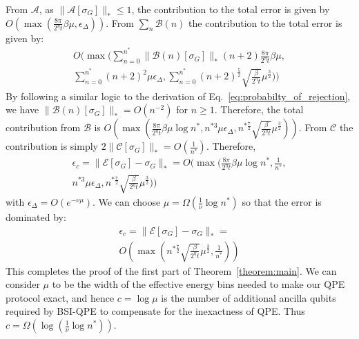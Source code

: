 \documentclass[aps,floatfix,10pt,amssymb,amsfont,amsmath,superscriptaddress,float,nofootinbib,longbibliography,nobalancelastpage,twocolumn]{revtex4-2}
\begin{document}
From $\mathcal{A}$, as $\|\mathcal{A}[\sigma_G]\|_* \leq 1$, the contribution to the total error is given by $O(\max(\frac{8\pi}{2^{\eta}t}\beta\mu,\epsilon_{\Delta}))$. From $\sum_n\mathcal{B}(n)$ the contribution to the total error is given by:
\begin{multline}
    O\!\bigg(\max\!\bigg(\sum_{n=0}^{n^*}\|\mathcal B(n)[\sigma_G]\|_* (n+2)\frac{8\pi}{2^{\eta}t}\beta \mu,\\
    \sum_{n=0}^{n^*}(n+2)^2\mu\epsilon_{\Delta}, \sum_{n=0}^{n^*}(n+2)^{\frac{5}{2}}\sqrt{\frac{\beta }{2^{\eta}t}}\mu^{\frac{3}{2}}\bigg)\bigg)
\end{multline}
By following a similar logic to the derivation of Eq.~\eqref{eq:probabilty_of_rejection}, we have $\|\mathcal B(n)[\sigma_G]\|_* = O(n^{-2})$ for $n\geq1$. Therefore, the total contribution from $\mathcal{B}$ is $O(\!\max(\frac{8\pi}{2^{\eta}t}\beta \mu \log n^*,n^{*3}\mu\epsilon_{\Delta},n^{*\frac{7}{2}}\sqrt{\frac{\beta }{2^{\eta}t}}\mu^{\frac{3}{2}}))$. From $\mathcal{C}$ the contribution is simply $2\|\mathcal{C}[\sigma_G]\|_* = O(\frac{1}{n^*})$. Therefore,
 \begin{multline}
   \epsilon_c = \|\mathcal{E}[\sigma_G] - \sigma_G\|_* = O\bigg(\max\bigg( \frac{8\pi}{2^{\eta}t}\beta\mu \log n^* ,\frac{1}{n^*},\\ n^{*3}\mu\epsilon_{\Delta},n^{*\frac{7}{2}}\sqrt{\frac{\beta }{2^{\eta}t}}\mu^{\frac{3}{2}}\bigg)\bigg)
   \label{eq:combinedtotalerror}
\end{multline}
with $\epsilon_{\Delta}=O(e^{-\nu\mu})$. We can choose $\mu = \Omega(\frac{1}{\nu}\log n^*)$ so that the error is dominated by:
 \begin{multline}
   \epsilon_c = \|\mathcal{E}[\sigma_G] - \sigma_G\|_* =\\ O\left(\max\left( n^{*\frac{7}{2}}\sqrt{\frac{\beta }{2^{\eta}t}}\mu^{\frac{3}{2}} ,\frac{1}{n^*}\right)\right)
    \label{eq:error_bound}
\end{multline}
This completes the proof of the first part of Theorem~\ref{theorem:main}. We can consider $\mu$ to be the width of the effective energy bins needed to make our QPE protocol exact, and hence $c=\log\mu$ is the number of additional ancilla qubits required by BSI-QPE to compensate for the inexactness of QPE. Thus $c=\Omega(\log(\frac{1}{\nu}\log n^*))$.
\end{document}
